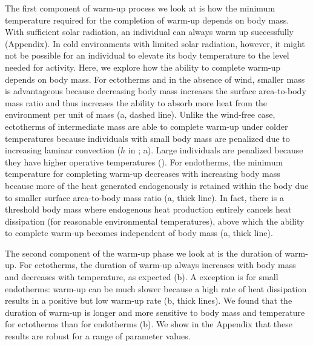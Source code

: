 The first component of warm-up process we look at is how the minimum temperature required for the completion of warm-up depends on body mass.
With sufficient solar radiation, an individual can always warm up successfully (Appendix).
In cold environments with limited solar radiation, however, it might not be possible for an individual to elevate its body temperature to the level needed for activity.
Here, we explore how the ability to complete warm-up depends on body mass.
For ectotherms and in the absence of wind, smaller mass is advantageous because decreasing body mass increases the surface area-to-body mass ratio and thus increases the ability to absorb more heat from the environment per unit of mass (a, dashed line).
Unlike the wind-free case, ectotherms of intermediate mass are able to complete warm-up under colder temperatures because individuals with small body mass are penalized due to increasing laminar convection ($h$ in ; a).
Large individuals are penalized because they have higher operative temperatures (). %
For endotherms, the minimum temperature for completing warm-up decreases with increasing body mass because more of the heat generated endogenously is retained within the body due to smaller surface area-to-body mass ratio (a, thick line).
In fact, there is a threshold body mass where endogenous heat production entirely cancels heat dissipation (for reasonable environmental temperatures), above which the ability to complete warm-up becomes independent of body mass (a, thick line).

The second component of the warm-up phase we look at is the duration of warm-up.
For ectotherms, the duration of warm-up always increases with body mass and decreases with temperature, as expected (b).
A exception is for small endotherms: warm-up can be much slower because a high rate of heat dissipation results in a positive but low warm-up rate (b, thick lines).
We found that the duration of warm-up is longer and more sensitive to body mass and temperature for ectotherms than for endotherms (b).
We show in the Appendix that these results are robust for a range of parameter values.


